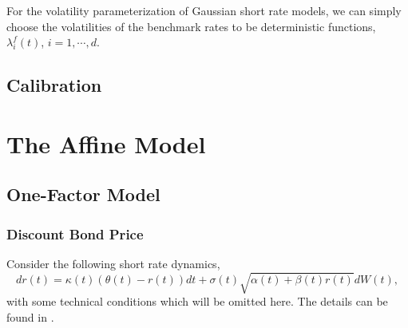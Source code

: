 \documentclass[12pt]{article}
\begin{document}
      For the volatility parameterization of Gaussian short rate models, we can simply choose the volatilities of
      the benchmark rates to be deterministic functions, $\lambda_i^f(t)$, $i=1,\cdots,d$.

  \subsection{Calibration}


\section{The Affine Model}

  \subsection{One-Factor Model}

    \subsubsection{Discount Bond Price}

      Consider the following short rate dynamics,
      \begin{equation}
        dr(t)=\kappa(t)\left(\theta(t)-r(t)\right)dt + \sigma(t)\sqrt{\alpha(t) + \beta(t) r(t)}dW(t),
      \end{equation}
      with some technical conditions which will be omitted here. The details can be found in \cite{AP}.
\end{document}
